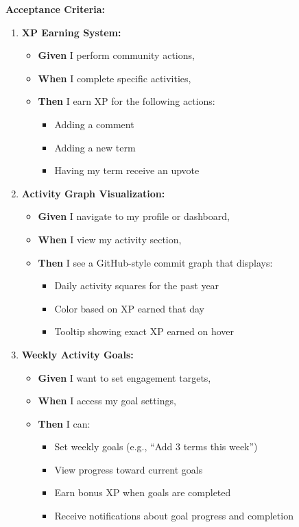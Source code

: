 \documentclass[12pt]{article}
\begin{document}
\vspace{1em}
\textbf{Acceptance Criteria:}
\begin{enumerate}
    \item \textbf{XP Earning System:}
    \begin{itemize}
        \item \textbf{Given} I perform community actions,
        \item \textbf{When} I complete specific activities,
        \item \textbf{Then} I earn XP for the following actions:
        \begin{itemize}
            \item Adding a comment
            \item Adding a new term
            \item Having my term receive an upvote
        \end{itemize}
    \end{itemize}

    \item \textbf{Activity Graph Visualization:}
    \begin{itemize}
        \item \textbf{Given} I navigate to my profile or dashboard,
        \item \textbf{When} I view my activity section,
        \item \textbf{Then} I see a GitHub-style commit graph that displays:
        \begin{itemize}
            \item Daily activity squares for the past year
            \item Color based on XP earned that day
            \item Tooltip showing exact XP earned on hover
        \end{itemize}
    \end{itemize}

    \item \textbf{Weekly Activity Goals:}
    \begin{itemize}
        \item \textbf{Given} I want to set engagement targets,
        \item \textbf{When} I access my goal settings,
        \item \textbf{Then} I can:
        \begin{itemize}
            \item Set weekly goals (e.g., ``Add 3 terms this week'')
            \item View progress toward current goals
            \item Earn bonus XP when goals are completed
            \item Receive notifications about goal progress and completion
        \end{itemize}
    \end{itemize}


\end{enumerate}
\end{document}
